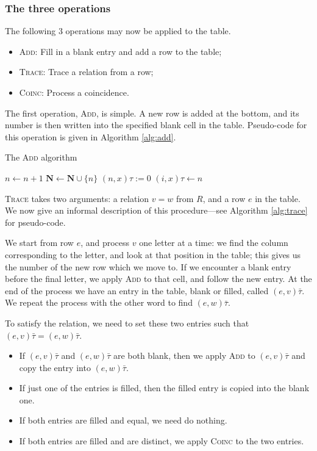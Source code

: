 \subsubsection{The three operations}

The following 3 operations may now be applied to the table.

\begin{itemize}
\item \textsc{Add}: Fill in a blank entry and add a row to the table;
\item \textsc{Trace}: Trace a relation from a row;
\item \textsc{Coinc}: Process a coincidence.
\end{itemize}

The first operation, \textsc{Add}, is simple.  A new row is added at the bottom,
and its number is then written into the specified blank cell in the table.
Pseudo-code for this operation is given in Algorithm \ref{alg:add}.

\begin{algorithm}
\caption{The \textsc{Add} algorithm}
\label{alg:add}
\begin{algorithmic}[1]
\State $n \gets n + 1$
\State $\mathbf{N} \gets \mathbf{N} \cup \{n\}$
  \State $(n, x)\tau := 0$
\EndFor
\State $(i, x)\tau \gets n$  
\EndProcedure
\end{algorithmic}
\end{algorithm}

\textsc{Trace} takes two arguments: a relation $v=w$ from $R$, and a row $e$
in the table.  We now give an informal description of this procedure---see
Algorithm \ref{alg:trace} for pseudo-code.

We start from row $e$, and process $v$ one letter at a time: we
find the column corresponding to the letter, and look at that position in the
table; this gives us the number of the new row which we move to.  If we
encounter a blank entry before the final letter, we apply \textsc{Add} to that
cell, and follow the new entry.  At the end of the process we have an entry in
the table, blank or filled, called $(e, v)\bar\tau$.  We repeat the
process with the other word to find $(e, w)\bar\tau$.

To satisfy the relation, we need to set these two entries such that
$(e, v)\bar\tau = (e, w)\bar\tau$.
\begin{itemize}
\item If $(e, v)\bar\tau$ and $(e, w)\bar\tau$ are both blank, then we apply
  \textsc{Add} to $(e, v)\bar\tau$ and copy the entry into $(e, w)\bar\tau$.
\item If just one of the entries is filled, then the filled entry is copied into
  the blank one.
\item If both entries are filled and equal, we need do nothing.
\item If both entries are filled and are distinct, we apply \textsc{Coinc} to
  the two entries.
\end{itemize}

